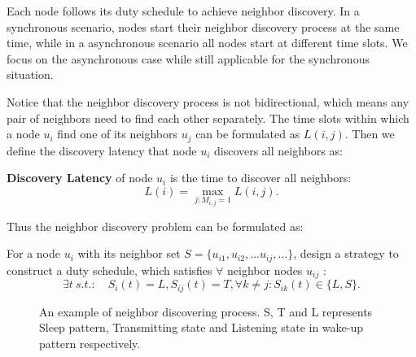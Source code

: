 Each node follows its duty schedule to achieve neighbor discovery. In a synchronous scenario,
nodes start their neighbor discovery process at the same time, while in a asynchronous  scenario
all nodes start at different time slots. We focus on the asynchronous case while still applicable for the
synchronous situation.

 
Notice that the neighbor discovery process is not bidirectional, which means any pair of neighbors 
need to find each other separately. The time slots within which a node $u_i$ find one of its neighbors $u_j$ can be formulated 
as $L(i,j)$. Then we define the discovery latency that node $u_i$ discovers all neighbors as:
\begin{definition}
\textbf{Discovery Latency} of node $u_i$ is the time to discover all neighbors:
$$L(i) = \max_{j:M_{i,j}=1} L(i,j).
$$
\end{definition}

Thus the neighbor discovery problem can be formulated as:
\begin{problem}
For a node $u_i$ with its neighbor set $S = \{u_{i1},u_{i2},...u_{ij},...\}$, 
design a strategy to construct a duty schedule, which satisfies
$\forall$ neighbor nodes $u_{ij}$ :
$$
\exists t \ s.t. :  \quad
S_i(t) = L ,
S_{ij}(t) = T,
\forall k \neq j : S_{ik}(t) \in \{L, S\}.
$$

\end{problem}

\begin{figure}[!h]
\centering
{}
\vspace{0.03in}
\caption{An example of neighbor discovering process. S, T and L represents Sleep pattern, 
Transmitting state and Listening state in wake-up pattern respectively.}
\label{NDexample}
\end{figure}


